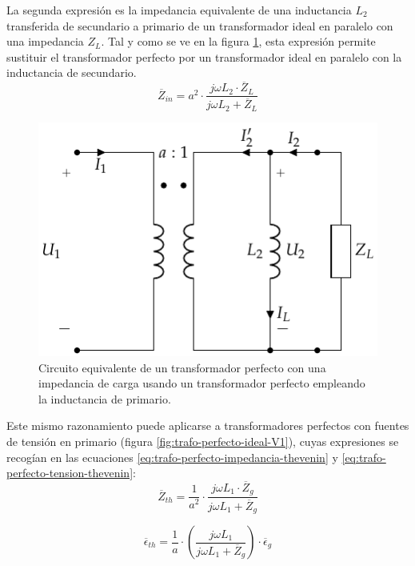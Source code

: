   La segunda expresión es la impedancia equivalente de una inductancia $L_2$ transferida de secundario a primario de un transformador ideal en paralelo con una impedancia $Z_L$. Tal y como se ve en la figura \ref{fig:trafo-perfecto-ideal-L2}, esta expresión permite sustituir el transformador perfecto por un transformador ideal en paralelo con la inductancia de secundario.
  \[
    \overline{Z}_{in} = a^2 \cdot \frac{j \omega L_2 \cdot
    \overline{Z}_L}{j\omega L_2 + \overline{Z}_L}
\]

  \begin{figure}
    \centering
    \includegraphics[height=.2\textheight]{../figs/TrafoPerfecto_Ideal2.pdf}
        \caption{Circuito equivalente de un transformador perfecto con una impedancia de carga usando un transformador perfecto empleando la inductancia de primario.
}
\label{fig:trafo-perfecto-ideal-L2}
  \end{figure}

  Este mismo razonamiento puede aplicarse a transformadores perfectos con fuentes de tensión en primario (figura \ref{fig:trafo-perfecto-ideal-V1}), cuyas expresiones se recogían en las ecuaciones \ref{eq:trafo-perfecto-impedancia-thevenin} y \ref{eq:trafo-perfecto-tension-thevenin}:
  \[
    \overline{Z}_{th} = \frac{1}{a^2} \cdot \frac{j \omega L_1 \cdot
    \overline{Z}_g}{j\omega L_1 + \overline{Z}_g}
  \]

  \[
    \overline{\epsilon}_{th} = \frac{1}{a} \cdot \left(\frac{j\omega
      L_1}{j\omega L_1 + \overline{Z}_g}\right) \cdot
    \overline{\epsilon}_g
  \]

